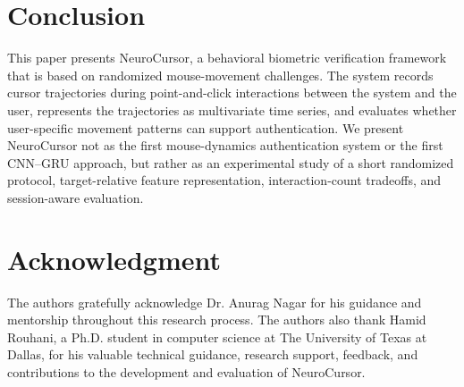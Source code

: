 \documentclass[conference]{IEEEtran}
\begin{document}

\section{Conclusion}

This paper presents NeuroCursor, a behavioral biometric verification framework that is based on randomized mouse-movement challenges. The system records cursor trajectories during point-and-click interactions between the system and the user, represents the trajectories as multivariate time series, and evaluates whether user-specific movement patterns can support authentication. We present NeuroCursor not as the first mouse-dynamics authentication system or the first CNN--GRU approach, but rather as an experimental study of a short randomized protocol, target-relative feature representation, interaction-count tradeoffs, and session-aware evaluation. 



\section*{Acknowledgment}
The authors gratefully acknowledge Dr. Anurag Nagar for his guidance and mentorship throughout this research process. The authors also thank Hamid Rouhani, a Ph.D. student in computer science at The University of Texas at Dallas, for his valuable technical guidance, research support, feedback, and contributions to the development and evaluation of NeuroCursor. 
\end{document}
